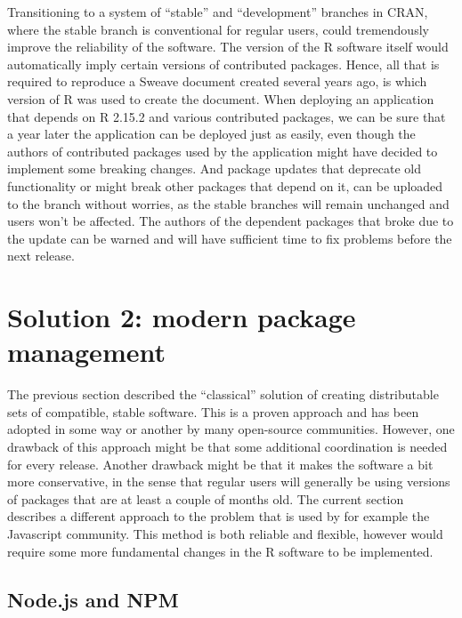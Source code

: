 Transitioning to a system of ``stable'' and ``development'' branches in CRAN,
where the stable branch is conventional for regular users, could tremendously
improve the reliability of the software. The version of the R software itself
would automatically imply certain versions of contributed packages. Hence, all
that is required to reproduce a Sweave document created several years ago, is
which version of R was used to create the document. When deploying an
application that depends on R 2.15.2 and various contributed packages, we can
be sure that a year later the application can be deployed just as easily, even
though the authors of contributed packages used by the application might have
decided to implement some breaking changes.
And package updates that deprecate old functionality or might break other
packages that depend on it, can be uploaded to the  branch
without worries, as the stable branches will remain unchanged and users won't
be affected. The authors of the dependent packages that broke due to the update
can be warned and will have sufficient time to fix problems before the next
 release.

\section{Solution 2: modern package management}


The previous section described the ``classical'' solution of creating distributable
sets of compatible, stable software. This is a proven approach and has been
adopted in some way or another by many open-source communities. However, one
drawback of this approach might be that some additional coordination is needed
for every release. Another drawback might be that it makes the software a bit
more conservative, in the sense that regular users will generally be using
versions of packages that are at least a couple of months old. The current
section describes a different approach to the problem that is used by for
example the Javascript community. This method is both reliable and flexible,
however would require some more fundamental changes in the R software to be
implemented.

\subsection{Node.js and NPM}

